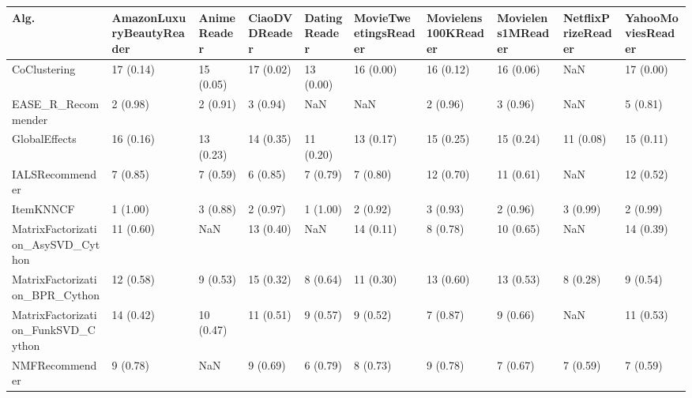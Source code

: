 \begin{tabular}{llllllllll}
\toprule
                               Alg. & AmazonLuxuryBeautyReader & AnimeReader & CiaoDVDReader & DatingReader & MovieTweetingsReader & Movielens100KReader & Movielens1MReader & NetflixPrizeReader & YahooMoviesReader \\
\midrule
                       CoClustering &                17 (0.14) &   15 (0.05) &     17 (0.02) &    13 (0.00) &            16 (0.00) &           16 (0.12) &         16 (0.06) &                NaN &         17 (0.00) \\
                 EASE\_R\_Recommender &                 2 (0.98) &    2 (0.91) &      3 (0.94) &          NaN &                  NaN &            2 (0.96) &          3 (0.96) &                NaN &          5 (0.81) \\
                      GlobalEffects &                16 (0.16) &   13 (0.23) &     14 (0.35) &    11 (0.20) &            13 (0.17) &           15 (0.25) &         15 (0.24) &          11 (0.08) &         15 (0.11) \\
                    IALSRecommender &                 7 (0.85) &    7 (0.59) &      6 (0.85) &     7 (0.79) &             7 (0.80) &           12 (0.70) &         11 (0.61) &                NaN &         12 (0.52) \\
                          ItemKNNCF &                 1 (1.00) &    3 (0.88) &      2 (0.97) &     1 (1.00) &             2 (0.92) &            3 (0.93) &          2 (0.96) &           3 (0.99) &          2 (0.99) \\
  MatrixFactorization\_AsySVD\_Cython &                11 (0.60) &         NaN &     13 (0.40) &          NaN &            14 (0.11) &            8 (0.78) &         10 (0.65) &                NaN &         14 (0.39) \\
     MatrixFactorization\_BPR\_Cython &                12 (0.58) &    9 (0.53) &     15 (0.32) &     8 (0.64) &            11 (0.30) &           13 (0.60) &         13 (0.53) &           8 (0.28) &          9 (0.54) \\
 MatrixFactorization\_FunkSVD\_Cython &                14 (0.42) &   10 (0.47) &     11 (0.51) &     9 (0.57) &             9 (0.52) &            7 (0.87) &          9 (0.66) &                NaN &         11 (0.53) \\
                     NMFRecommender &                 9 (0.78) &         NaN &      9 (0.69) &     6 (0.79) &             8 (0.73) &            9 (0.78) &          7 (0.67) &           7 (0.59) &          7 (0.59) \\

\end{tabular}
